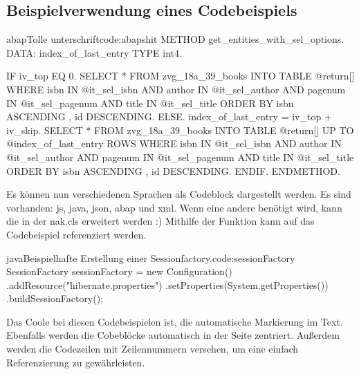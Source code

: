 \subsection{Beispielverwendung eines Codebeispiels}
\begin{codeBlock}{abap}{Tolle unterschrift}{code:abapshit}
METHOD get_entities_with_sel_options.
    DATA: index_of_last_entry TYPE int4.
    
    IF iv_top EQ 0.
        SELECT * FROM zvg_18a_39_books INTO TABLE @return[]
                WHERE isbn IN @it_sel_isbn
                    AND author IN @it_sel_author
                    AND pagenum IN @it_sel_pagenum
                    AND title IN @it_sel_title
                ORDER BY isbn ASCENDING , id DESCENDING.
    ELSE.
        index_of_last_entry = iv_top + iv_skip.
        SELECT * FROM zvg_18a_39_books
            INTO TABLE @return[]
                UP TO @index_of_last_entry ROWS
                WHERE isbn IN @it_sel_isbn
                    AND author IN @it_sel_author
                    AND pagenum IN @it_sel_pagenum
                    AND title IN @it_sel_title
                ORDER BY isbn ASCENDING , id DESCENDING.
    ENDIF.
ENDMETHOD.
\end{codeBlock}
Es können nun verschiedenen Sprachen als Codeblock dargestellt werden. Es sind vorhanden: js, java, json, abap und xml. Wenn eine andere benötigt wird, kann die in der nak.cls erweitert werden :) Mithilfe der  Funktion kann auf das Codebeispiel  referenziert werden. 

\begin{codeBlock}{java}{Beispielhafte Erstellung einer Sessionfactory.}{code:sessionFactory}
SessionFactory sessionFactory = new Configuration()
     .addResource("hibernate.properties")
     .setProperties(System.getProperties())
     .buildSessionFactory();
\end{codeBlock} 
Das Coole bei diesen Codebeispielen ist, die automatische Markierung im Text. Ebenfalls werden die Cobeblöcke automatisch in der Seite zentriert. Außerdem werden die Codezeilen mit Zeilennummern versehen, um eine einfach Referenzierung zu gewährleisten.